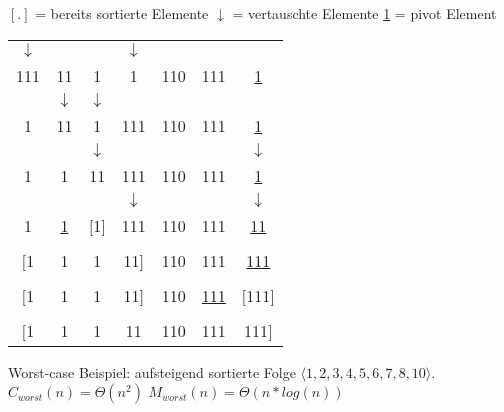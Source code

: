 \documentclass[a4paper, 12pt]{article}
\begin{document}
$[.]$ = bereits sortierte Elemente
\newline
$\downarrow$ = vertauschte Elemente
\newline
\underline{1} = pivot Element



\begin{tabular}{ c c c c c c c }
\hline
$\downarrow$ & & & $\downarrow$ & & & \\
111 & 11 & 1 & 1 & 110 & 111 & \underline{1} \\
\hline
 & $\downarrow$ & $\downarrow$ &  & & & \\
1 & 11 & 1 & 111 & 110 & 111 & \underline{1} \\
\hline
 &  & $\downarrow$ &  & & & $\downarrow$\\
1 & 1 & 11 & 111 & 110 & 111 & \underline{1} \\
\hline
 &  &  & $\downarrow$ & & & $\downarrow$\\
1 & \underline{1} & $[$1$]$ & 111 & 110 & 111 & \underline{11} \\
\hline
&  &  &  & & &\\
$[$1 & 1 & 1 & 11$]$ & 110 & 111 & \underline{111} \\
\hline
&  &  &  & & &\\
$[$1 & 1 & 1 & 11$]$ & 110 & \underline{111} & $[$111$]$ \\
\hline
&  &  &  & & &\\
$[$1 & 1 & 1 & 11 & 110 & 111 & 111$]$ \\
\hline


\end{tabular}


	
	
	
Worst-case Beispiel: aufsteigend sortierte Folge
\newline
$\langle 1,2,3,4,5,6,7,8,10  \rangle.$
\newline\newline
$C_{worst}(n)=\Theta(n^2)$ 
\newline
$M_{worst}(n)=\Theta(n*log(n))$ 
\end{document}
